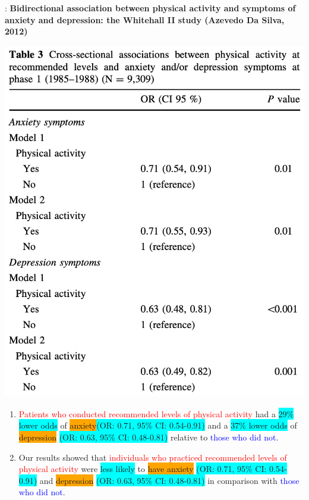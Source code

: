 \begin{frame}{\secname: \subsecname}
\footnotesize \textbf{Bidirectional association between physical activity and symptoms of anxiety and depression: the Whitehall II study (Azevedo Da Silva, 2012)}
\begin{minipage}{0.45\textwidth}
\vspace{2mm}
\includegraphics[scale=0.3]{image/physical.png}
\end{minipage}
\begin{minipage}{0.54\textwidth}
\begin{enumerate}
    \footnotesize
    \item<2|handout:2-> \textcolor{red}{Patients who conducted recommended levels of physical activity} had a \colorbox{cyan}{29\% lower odds} of \colorbox{orange}{anxiety}\colorbox{cyan}{(OR: 0.71, 95\% CI: 0.54-0.91)} and a \colorbox{cyan}{37\% lower odds} of \colorbox{orange}{depression} \colorbox{cyan}{(OR: 0.63, 95\% CI: 0.48-0.81)} relative to \textcolor{blue}{those who did not}.
    \item<3|handout:3> Our results showed that \textcolor{red}{individuals who practiced recommended levels of physical activity} were \colorbox{cyan}{less likely} to \colorbox{orange}{have anxiety} \colorbox{cyan}{(OR: 0.71, 95\% CI: 0.54-0.91)} and \colorbox{orange}{depression} \colorbox{cyan}{(OR: 0.63, 95\% CI: 0.48-0.81)} in comparison with \textcolor{blue}{those who did not}.
\end{enumerate}
\end{minipage}
\end{frame}


